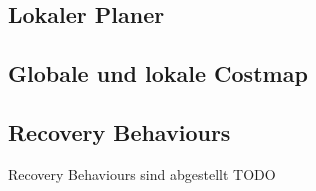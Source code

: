 \documentclass[oribibl]{llncs}
\begin{document}


\subsection{Lokaler Planer}
\subsection{Globale und lokale Costmap}
\subsection{Recovery Behaviours}
Recovery Behaviours sind abgestellt TODO



\clearpage
\newpage

\begin{figure}
\end{figure}
\end{document}
